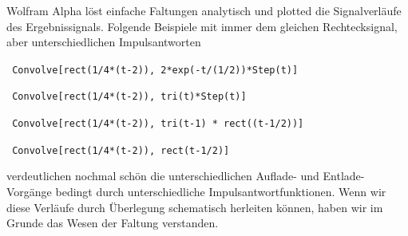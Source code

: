 \newpage
Wolfram Alpha löst einfache Faltungen analytisch und plotted die Signalverläufe
des Ergebnissignals. Folgende Beispiele mit immer
dem gleichen Rechtecksignal, aber unterschiedlichen Impulsantworten

\verb| Convolve[rect(1/4*(t-2)), 2*exp(-t/(1/2))*Step(t)]|

\verb| Convolve[rect(1/4*(t-2)), tri(t)*Step(t)]|

\verb| Convolve[rect(1/4*(t-2)), tri(t-1) * rect((t-1/2))]|

\verb| Convolve[rect(1/4*(t-2)), rect(t-1/2)]|

verdeutlichen nochmal schön die unterschiedlichen Auflade- und Entlade-Vorgänge
bedingt durch unterschiedliche Impulsantwortfunktionen. Wenn wir diese Verläufe
durch Überlegung schematisch herleiten können, haben wir im Grunde das Wesen der
Faltung verstanden.
